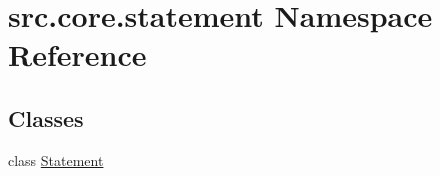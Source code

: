 \hypertarget{namespacesrc_1_1core_1_1statement}{\section{src.\+core.\+statement Namespace Reference}
\label{namespacesrc_1_1core_1_1statement}
}
\subsection*{Classes}
\begin{DoxyCompactItemize}
\item 
class \hyperlink{classsrc_1_1core_1_1statement_1_1_statement}{Statement}
\end{DoxyCompactItemize}
